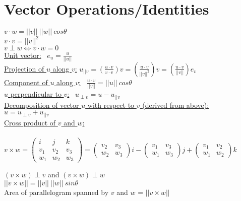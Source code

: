 \documentclass[10pt]{article}
\begin{document}
\maketitle

\section*{Vector Operations/Identities}
\noindent
$
v \cdot w = ||v|| \ ||w|| \ cos\theta
$\\
$
v \cdot v = ||v||^2
$\\
\noindent
$
v \perp w \Leftrightarrow v \cdot w = 0
$\\
\underline{Unit vector:} \ $e_u = \frac{u}{||u||}$\\
\underline{Projection of $u$ along $v$:}
$u_{||v} = \left(\frac{u\cdot v}{v \cdot v}\right) v = \left(\frac{u\cdot v}{||v||^2}\right)v = \left(\frac{u\cdot v}{||v||}\right)e_v$\\
\underline{Component of $u$ along $v$:} \ $\frac{u \cdot v}{||v||} = ||u|| \ cos\theta$\\	
\noindent
\underline{$u$ perpendicular to $v$:} \ $u_{\perp v} = u - u_{||v}$\\
\underline{Decomposition of vector $u$ with respect to $v$ (derived from above):} \ $u = u_{\perp v} + u_{||v}$\\

\noindent
\underline{Cross product of $v$ and $w$:}\\\\
$
v \times w = \begin{pmatrix}  i&j&k\\v_1&v_2&v_3\\w_1&w_2&w_3\end{pmatrix}
=  \begin{pmatrix}  v_2&v_3\\w_2&w_3 \end{pmatrix}i
-\begin{pmatrix}  v_1&v_3\\w_1&w_3 \end{pmatrix}j
+\begin{pmatrix}  v_1&v_2\\w_1&w_2 \end{pmatrix}k
$\\
\indent


\noindent
$(v \times w) \perp v$ and $(v \times w) \perp w$\\
$||v \times w|| = ||v|| \ ||w|| \ sin \theta$\\
Area of parallelogram spanned by $v$ and $w$ = $||v \times w||$\\
\end{document}
